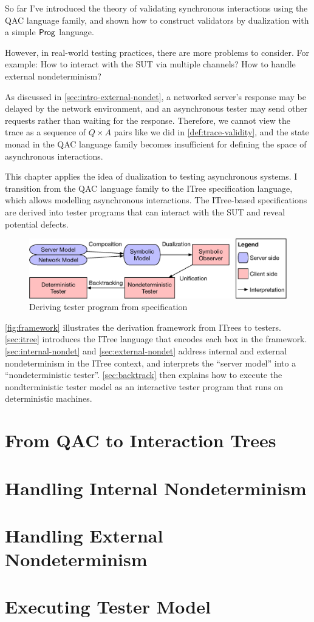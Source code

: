 So far I've introduced the theory of validating synchronous interactions using
the QAC language family, and shown how to construct validators by dualization
with a simple $\mathsf{Prog}$ language.

However, in real-world testing practices, there are more problems to consider.
For example: How to interact with the SUT via multiple channels?  How to handle
external nondeterminism?

As discussed in \autoref{sec:intro-external-nondet}, a networked server's
response may be delayed by the network environment, and an asynchronous tester
may send other requests rather than waiting for the response.  Therefore, we
cannot view the trace as a sequence of $Q\times A$ pairs like we did
in \autoref{def:trace-validity}, and the state monad in the QAC language family
becomes insufficient for defining the space of asynchronous interactions.

This chapter applies the idea of dualization to testing asynchronous systems.  I
transition from the QAC language family to the ITree specification language,
which allows modelling asynchronous interactions.  The ITree-based
specifications are derived into tester programs that can interact with the SUT
and reveal potential defects.

\begin{figure}
  \includegraphics[width=\linewidth]{figures/framework}
  \caption{Deriving tester program from specification}
  \label{fig:framework}
\end{figure}

\autoref{fig:framework} illustrates the derivation framework from ITrees to
testers.  \autoref{sec:itree} introduces the ITree language that encodes each
box in the framework.  \autoref{sec:internal-nondet} and
\autoref{sec:external-nondet} address internal and external nondeterminism in
the ITree context, and interprets the ``server model'' into a ``nondeterministic
tester''.  \autoref{sec:backtrack} then explains how to execute the
nondterministic tester model as an interactive tester program that runs on
deterministic machines.

\section{From QAC to Interaction Trees}
\label{sec:itree}


\section{Handling Internal Nondeterminism}
\label{sec:internal-nondet}


\section{Handling External Nondeterminism}
\label{sec:external-nondet}


\section{Executing Tester Model}
\label{sec:backtrack}


